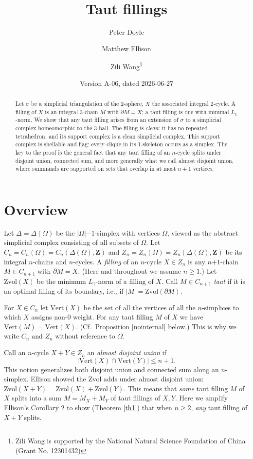 \documentclass[12pt]{article}
\title{Taut fillings}
\author{Peter Doyle \and Matthew Ellison \and Zili Wang\thanks{
Zili Wang is supported by
the National Natural Science Foundation of China (Grant No. 12301432)
}}
\date{Version A-06, dated 2026-06-27}
\def\ZZ{\mathbf{Z}}
\def\del{\partial}
\newcommand{\kw}{\mathrm}
\newcommand{\vertices}{\kw{Vert}}
\newcommand{\Zvol}{\kw{Zvol}}
\newcommand{\pls}{\mathord{+}}
\newcommand{\mns}{\mathord{-}}
\begin{document}
\maketitle

\begin{abstract}
Let $\sigma$ be a simplicial triangulation of the 2-sphere,
$X$ the associated integral 2-cycle.
A filling of $X$ is an integral 3-chain $M$
with $\del M = X$;
a taut filling is one with minimal $L_1$-norm.
We show that any taut filling 
arises from an extension of $\sigma$ to
a simplicial complex homeomorphic to the 3-ball.
The filling is \emph{clean}: it has no repeated tetrahedron, and its
support complex is a clean simplicial complex.
This support complex is shellable and flag: every clique in its
1-skeleton occurs as a simplex.
The key to the proof is the general
fact that any taut filling of an $n$-cycle
splits under disjoint union, connected sum, and more generally
what we call almost disjoint union,
where summands are supported on sets that overlap in at most $n+1$ vertices.
\end{abstract}

\section{Overview}
Let $\Delta = \Delta(\Omega)$ be the $|\Omega|\mns 1$-simplex
with vertices $\Omega$,
viewed as the abstract simplicial complex consisting of all subsets of
$\Omega$.
Let $C_n=C_n(\Omega)=C_n(\Delta(\Omega),\ZZ)$
and $Z_n=Z_n(\Omega)=Z_n(\Delta(\Omega),\ZZ)$
be its integral $n$-chains and $n$-cycles.
A \emph{filling} of an $n$-cycle $X \in Z_n$ is any
$n\pls 1$-chain $M \in C_{n+1}$ with $\del M = X$.
(Here and throughout we assume $n\geq 1$.)
Let $\Zvol(X)$ be the minimum $L_1$-norm of a filling of $X$.
Call $M \in C_{n+1}$ \emph{taut} if it is an optimal filling
of its boundary, i.e., if $|M|=\Zvol(\del M)$.

For $X \in C_n$ let
$\vertices(X)$ be the set of all the vertices of all the $n$-simplices
to which $X$ assigns non-$0$ weight.
For any taut filling $M$ of $X$ we have $\vertices(M) = \vertices(X)$.
(Cf.\ Proposition \ref{nointernal} below.)
This is why we write $C_n$ and $Z_n$ without reference to $\Omega$.

Call an $n$-cycle $X+Y \in Z_n$ an \emph{almost disjoint union} if
\[
|\vertices(X) \cap \vertices(Y)| \leq n+1
.
\]
This notion generalizes both disjoint union and connected sum
along an $n$-simplex.
Ellison \cite{ellison:gap}
showed the $\Zvol$ adds under almost disjoint union:
$\Zvol(X+Y) = \Zvol(X) + \Zvol(Y)$.
This means that \emph{some} taut filling $M$ of $X$ splits into a sum
$M=M_X+M_Y$ of taut fillings of $X,Y$.
Here we amplify Ellison's Corollary 2 to show (Theorem \ref{th1})
that when $n \geq 2$, \emph{any} taut filling of $X+Y$ splits.
\end{document}

